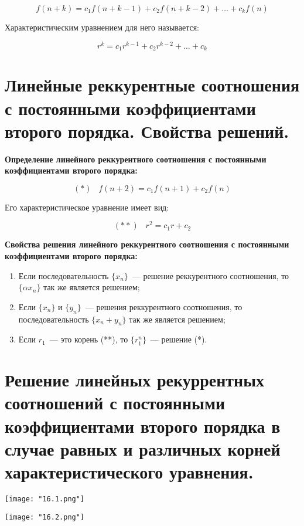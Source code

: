    \[
        f(n + k) = c_1 f(n + k - 1) + c_2 f(n + k - 2) + \dots + c_k f(n)  
    \]
    \smallskip

    Характеристическим уравнением для него называется:
    \smallskip

    \[
        r^k = c_1 r^{k - 1} + c_2 r^{k - 2} + \dots + c_k  
    \]

\section{Линейные реккурентные соотношения с постоянными коэффициентами
второго порядка. Свойства решений.}

\textbf{Определение линейного реккурентного соотношения с постоянными коэффициентами
второго порядка:}
    \smallskip

    \[
        (*) \;\;\; f(n + 2) = c_1 f(n + 1) + c_2 f(n)   
    \]
    \smallskip

    Его характеристическое уравнение имеет вид:
    \smallskip

    \[
       (**) \;\;\; r^2 = c_1 r + c_2  
    \]
    \bigskip

\textbf{Свойства решения линейного реккурентного соотношения с постоянными
коэффициентами второго порядка:}
    \smallskip
    
    \begin{enumerate}
        \item{Если последовательность $\{x_n\}$~--- решение реккурентного соотношения,
        то $\{\alpha x_n\}$ так же является решением;}
        \item{Если $\{x_n\}$ и $\{y_n\}$~--- решения реккурентного соотношения,
        то последовательность $\{x_n + y_n\}$ так же является решением;}
        \item{Если $r_1$~--- это корень (**), то $\{r_1^n\}$~--- решение (*).}
    \end{enumerate}

\section{Решение линейных рекуррентных соотношений с постоянными коэффициентами 
второго порядка в случае равных и различных корней характеристического 
уравнения.}    

\begin{center}
    \texttt{[image: "16.1.png"]}
    \bigskip
    
    \texttt{[image: "16.2.png"]}
\end{center}

